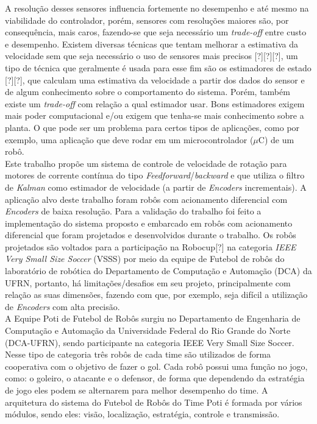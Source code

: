 A resolução desses sensores influencia fortemente no desempenho e até mesmo na viabilidade do controlador, porém, sensores com resoluções maiores são, por consequência, mais caros, fazendo-se que seja necessário um \emph{trade-off} entre custo e desempenho. Existem diversas técnicas que tentam melhorar a estimativa da velocidade sem que seja necessário o uso de sensores mais precisos [?][?][?], um tipo de técnica que geralmente é usada para esse fim são os estimadores de estado [?][?], que calculam uma estimativa da velocidade a partir dos dados do sensor e de algum conhecimento sobre o comportamento do sistema. Porém, também existe um \emph{trade-off} com relação a qual estimador usar. Bons estimadores exigem mais poder computacional e/ou exigem que tenha-se mais conhecimento sobre a planta. O que pode ser um problema para certos tipos de aplicações, como por exemplo, uma aplicação que deve rodar em um microcontrolador ($\mu$C) de um robô.\\



Este trabalho propõe um sistema de controle de velocidade de rotação para motores de corrente contínua do tipo \emph{Feedforward}/\emph{backward} e que utiliza o filtro de \emph{Kalman} como estimador de velocidade (a partir de \emph{Encoders} incrementais). A aplicação alvo deste trabalho foram robôs com acionamento diferencial com \emph{Encoders} de baixa resolução. Para a validação do trabalho foi feito a implementação do sistema proposto e embarcado em robôs com acionamento diferencial que foram projetados e desenvolvidos durante o trabalho. Os robôs projetados são voltados para a participação na Robocup[?] na categoria \emph{IEEE Very Small Size Soccer} (VSSS) por meio da equipe de Futebol de robôs do laboratório de robótica do Departamento de Computação e Automação (DCA) da UFRN, portanto, há limitações/desafios em seu projeto, principalmente com relação as suas dimensões, fazendo com que, por exemplo, seja difícil a utilização de \emph{Encoders} com alta precisão.\\



A Equipe Poti de Futebol de Robôs surgiu no Departamento de Engenharia de Computação e Automação da Universidade Federal do Rio Grande do Norte (DCA-UFRN), sendo participante na categoria IEEE Very Small Size Soccer.\\

Nesse tipo de categoria três robôs de cada time são utilizados de forma cooperativa com o objetivo de fazer o gol. Cada robô possui uma função no jogo, como: o goleiro, o atacante e o defensor, de forma que dependendo da estratégia de jogo eles podem se alternarem para melhor desempenho do time. A arquitetura do sistema do Futebol de Robôs do Time Poti é formada por vários módulos, sendo eles: visão, localização, estratégia, controle e transmissão.\\

